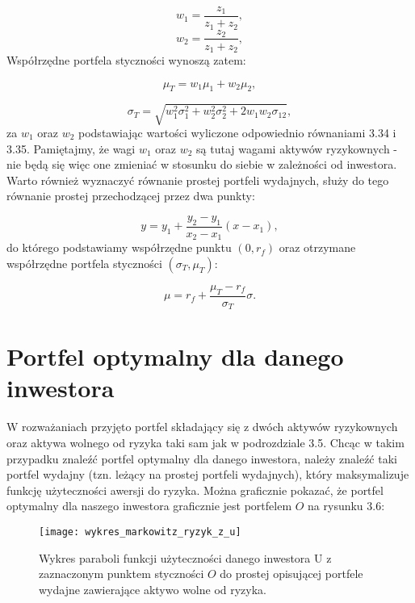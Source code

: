 \documentclass[magister]{dyplom}
\begin{document}
\begin{equation}
	w_1 = \frac{z_1}{z_1 + z_2},
\end{equation}
\begin{equation}
	w_2 = \frac{z_2}{z_1 + z_2},
\end{equation}
Współrzędne portfela styczności wynoszą zatem:

\begin{equation}
	\mu_T = w_1\mu_1 + w_2\mu_2,
\end{equation}

\begin{equation}
	\sigma_T = \sqrt{w_1^{2}\sigma_1^{2} + w_2^{2}\sigma_2^{2} + 2w_1w_2\sigma_{12}},
\end{equation}
za $w_1$ oraz $w_2$ podstawiając wartości wyliczone odpowiednio równaniami 3.34 i 3.35\cite{book}. Pamiętajmy, że wagi $w_1$ oraz $w_2$ są tutaj wagami aktywów ryzykownych - nie będą się więc one zmieniać w stosunku do siebie w zależności od inwestora.\\

Warto również wyznaczyć równanie prostej portfeli wydajnych, służy do tego równanie prostej przechodzącej przez dwa punkty:

\begin{equation}
	y = y_1 + \frac{y_2 - y_1}{x_2 - x_1}(x - x_1),
\end{equation}
do którego podstawiamy współrzędne punktu $(0, r_f)$ oraz otrzymane współrzędne portfela styczności $(\sigma_T, \mu_T)$:

\begin{equation}
	\mu = r_f + \frac{\mu_T - r_f}{\sigma_T}\sigma.
\end{equation}
\newpage
\section{Portfel optymalny dla danego inwestora}
W rozważaniach przyjęto portfel składający się z dwóch aktywów ryzykownych oraz aktywa wolnego od ryzyka taki sam jak w podrozdziale 3.5. Chcąc w takim przypadku znaleźć portfel optymalny dla danego inwestora, należy znaleźć taki portfel wydajny (tzn. leżący na prostej portfeli wydajnych), który maksymalizuje funkcję użyteczności awersji do ryzyka. Można graficznie pokazać, że portfel optymalny dla naszego inwestora graficznie jest portfelem $O$ na rysunku 3.6:\\

\begin{figure}[h]
	\centering
	\texttt{[image: wykres\_markowitz\_ryzyk\_z\_u]}
	\caption{Wykres paraboli funkcji użyteczności danego inwestora U z zaznaczonym punktem styczności $O$ do prostej opisującej portfele wydajne zawierające aktywo wolne od ryzyka.}
\end{figure}
\end{document}
